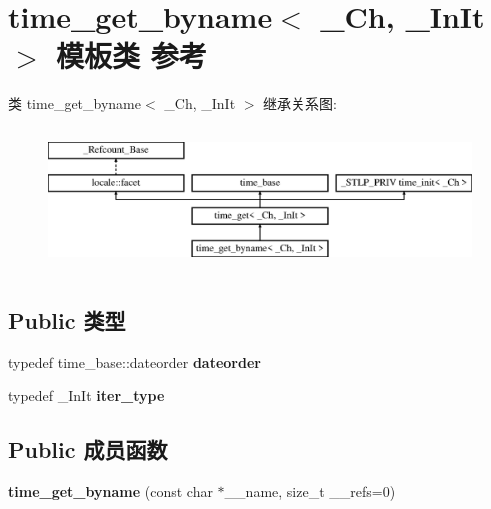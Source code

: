 \hypertarget{classtime__get__byname}{}\section{time\+\_\+get\+\_\+byname$<$ \+\_\+\+Ch, \+\_\+\+In\+It $>$ 模板类 参考}
\label{classtime__get__byname}
类 time\+\_\+get\+\_\+byname$<$ \+\_\+\+Ch, \+\_\+\+In\+It $>$ 继承关系图\+:\begin{figure}[H]
\begin{center}
\leavevmode
\includegraphics[height=3.809524cm]{classtime__get__byname}
\end{center}
\end{figure}
\subsection*{Public 类型}
\begin{DoxyCompactItemize}
\item 
\mbox{\label{classtime__get__byname_aff0f3b8fcafb6bc09cf8c722daaae252}} 
typedef time\+\_\+base\+::dateorder {\bfseries dateorder}
\item 
\mbox{\label{classtime__get__byname_a4ab5f7f6fc3c027c6e64868cab9de4cf}} 
typedef \+\_\+\+In\+It {\bfseries iter\+\_\+type}
\end{DoxyCompactItemize}
\subsection*{Public 成员函数}
\begin{DoxyCompactItemize}
\item 
\mbox{\label{classtime__get__byname_ae065b0577e97784ffe68f1a036343ab0}} 
{\bfseries time\+\_\+get\+\_\+byname} (const char $\ast$\+\_\+\+\_\+name, size\+\_\+t \+\_\+\+\_\+refs=0)
\end{DoxyCompactItemize}
